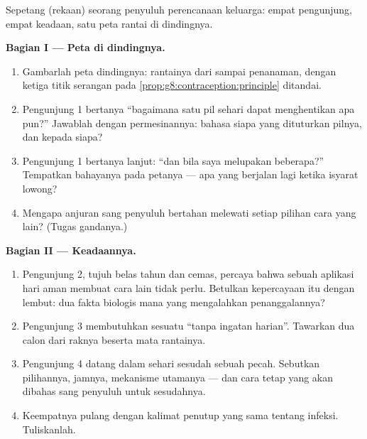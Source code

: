 \begin{problem}\label{pb:g8:contraception:1}
Sepetang (rekaan) seorang penyuluh perencanaan keluarga:
empat pengunjung, empat keadaan, satu peta rantai di
dindingnya.

\medskip\noindent\textbf{Bagian I --- Peta di
dindingnya.}
\begin{enumerate}
  \item Gambarlah peta dindingnya: rantainya dari 
        sampai penanaman, dengan ketiga titik serangan pada
        \cref{prop:g8:contraception:principle} ditandai.
  \item Pengunjung 1 bertanya ``bagaimana satu pil sehari
        dapat menghentikan apa pun?'' Jawablah dengan
        permesinannya: bahasa siapa yang dituturkan pilnya,
        dan kepada siapa?
  \item Pengunjung 1 bertanya lanjut: ``dan bila saya
        melupakan beberapa?'' Tempatkan bahayanya pada
        petanya --- apa yang berjalan lagi ketika isyarat
         lowong?
  \item Mengapa anjuran  sang penyuluh bertahan
        melewati setiap pilihan cara yang lain? (Tugas
        gandanya.)
\end{enumerate}

\medskip\noindent\textbf{Bagian II --- Keadaannya.}
\begin{enumerate}[resume]
  \item Pengunjung 2, tujuh belas tahun dan cemas, percaya
        bahwa sebuah aplikasi hari aman membuat cara lain
        tidak perlu. Betulkan kepercayaan itu dengan
        lembut: dua fakta biologis mana yang mengalahkan
        penanggalannya?
  \item Pengunjung 3 membutuhkan sesuatu ``tanpa ingatan
        harian''. Tawarkan dua calon dari raknya beserta
        mata rantainya.
  \item Pengunjung 4 datang dalam sehari sesudah sebuah
         pecah. Sebutkan pilihannya, jamnya,
        mekanisme utamanya --- dan cara tetap yang akan
        dibahas sang penyuluh untuk sesudahnya.
  \item Keempatnya pulang dengan kalimat penutup yang sama
        tentang infeksi. Tuliskanlah.
\end{enumerate}


\end{problem}
